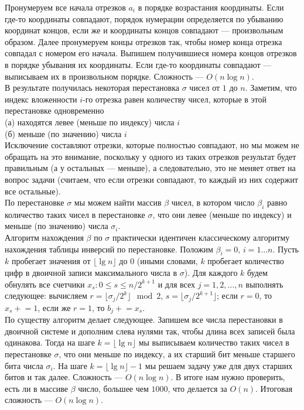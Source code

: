 \documentclass{article}
\begin{document}
Пронумеруем все начала отрезков $a_i$ в порядке возрастания координаты. Если где-то координаты совпадают, порядок нумерации определяется по убыванию координат концов, если же и координаты концов совпадают --- произвольным образом. Далее пронумеруем концы отрезков так, чтобы номер конца отрезка совпадал с номером его начала. Выпишем получившиеся номера концов отрезков в порядке убывания их координаты. Если где-то координаты совпадают --- выписываем их в произвольном порядке. Сложность --- $O(n \log n)$.\\
В результате получилась некоторая перестановка $\sigma$ чисел от $1$ до $n$. Заметим, что индекс вложенности $i$-го отрезка равен количеству чисел, которые в этой перестановке одновременно\\
(а) находятся левее (меньше по индексу) числа $i$\\
(б) меньше (по значению) числа $i$\\
Исключение составляют отрезки, которые полностью совпадают, но мы можем не обращать на это внимание, поскольку у одного из таких отрезков результат будет правильным (а у остальных --- меньше), а следовательно, это не меняет ответ на вопрос задачи (считаем, что если отрезки совпадают, то каждый из них содержит все остальные).\\
По перестановке $\sigma$ мы можем найти массив $\beta$ чисел, в котором число $\beta_i$ равно количество таких чисел в перестановке $\sigma$, что они левее (меньше по индексу) и меньше (по значению) числа $\sigma_i$.\\
Алгоритм нахождения $\beta$ по $\sigma$ практически идентичен классическому алгоритму нахождения таблицы инверсий по перестановке. Положим $\beta_i = 0, \,i=1\ldots n$. Пусть $k$ пробегает 
значения от $\lfloor \lg n \rfloor$ до $0$ (иными словами, $k$ пробегает количество цифр в двоичной записи максимального числа в $\sigma$). Для каждого $k$ будем обнулять все счетчики $x_s: 0 \leqslant s \leqslant n/2^{k+1}$ и для всех $j=1,2,\ldots,n$ выполнять следующее: вычисляем $r=\lfloor \sigma_j/2^k \rfloor \mod 2$, $s = \lfloor \sigma_j/2^{k+1} \rfloor$; если $r=0$, то $x_s\mathrel{+}=1$, если же $r=1$, то $b_j\mathrel{+}=x_s$.\\
По существу алгоритм делает следующее. Запишем все числа перестановки в двоичной системе и дополним слева нулями так, чтобы длина всех записей была одинакова. Тогда на шаге $k = \lfloor \lg n \rfloor$ мы выписываем количество таких чисел в перестановке $\sigma$, что они меньше по индексу, а их старший бит меньше старшего бита числа $\sigma_i$. На шаге $k=\lfloor \lg n \rfloor - 1$ мы решаем задачу уже для двух старших битов и так далее. Сложность --- $O(n \log n)$. В итоге нам нужно проверить, есть ли в массиве $\beta$ число, большее чем $1000$, что делается за $O(n)$. Итоговая сложность --- $O(n \log n)$.
\end{document}
